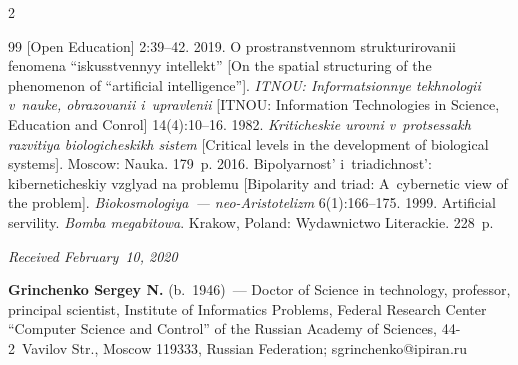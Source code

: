 \begin{multicols}{2}
{{\begin{thebibliography}{99}
[Open Education] 2:39--42.
 2019. O prostranstvennom strukturirovanii 
fenomena ``iskusstvennyy intellekt'' [On the spatial structuring of the 
phenomenon of ``artificial intelligence'']. \textit{ITNOU: Informatsionnye 
tekhnologii v~nauke, obrazovanii i~upravlenii} [ITNOU: Information 
Technologies in Science, Education and Conrol] 14(4):10--16.
 1982. \textit{Kriticheskie 
urovni v~protsessakh razvitiya biologicheskikh sistem} [Critical levels in 
the development of biological systems]. Moscow: Nauka. 179~p.
 2016. Bipolyarnost' i~triadichnost': 
kiberneticheskiy vzglyad na problemu [Bipolarity and triad: A~cybernetic 
view of the problem]. \textit{Biokosmologiya~--- neo-Aristotelizm} 
6(1):166--175.
 1999. Artificial servility. \textit{Bomba megabitowa}. 
Krakow, Poland: Wydawnictwo Literackie. 228~p.
\end{thebibliography}

}
}

\end{multicols}

\vspace*{-3pt}

\hfill{\small\textit{Received February~10, 2020}}




\Contrl

\noindent
\textbf{Grinchenko Sergey N.} (b.\ 1946)~--- Doctor of Science in 
technology, professor, principal scientist, Institute of Informatics 
Problems, Federal Research Center ``Computer Science and Control'' of 
the Russian Academy of Sciences, 44-2~Vavilov Str., Moscow 119333, 
Russian Federation; \mbox{sgrinchenko@ipiran.ru}

\label{end\stat}

\renewcommand{\bibname}{\protect\rm Литература} 